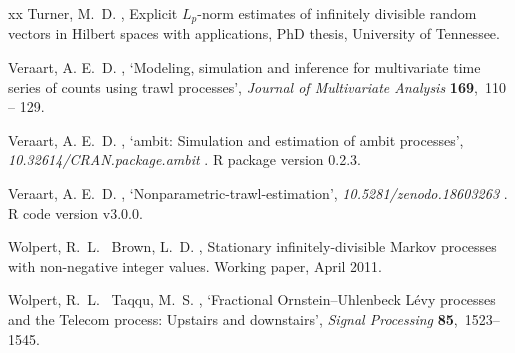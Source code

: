\documentclass{article}
\theoremstyle{plain}
\theoremstyle{definition}
\theoremstyle{remark}
\begin{document}
\begin{thebibliography}{xx}
Turner, M.~D.  \harvardyearright , Explicit $L_p $-norm estimates of infinitely divisible random vectors in {H}ilbert spaces with applications, PhD thesis, University of Tennessee.
\newline{}

Veraart, A. E.~D.  \harvardyearright , `Modeling, simulation and inference for multivariate time series of counts using trawl processes', {\em Journal of Multivariate Analysis} {\bf 169},~110 -- 129.
\newline{}

Veraart, A. E.~D.  \harvardyearright , `ambit: Simulation and estimation of ambit processes', {\em 10.32614/CRAN.package.ambit} .
\newblock R package version 0.2.3.
\newline{}

Veraart, A. E.~D.  \harvardyearright , `Nonparametric-trawl-estimation', {\em 10.5281/zenodo.18603263} .
\newblock R code version v3.0.0.
\newline{}

Wolpert, R.~L. \harvardand\ Brown, L.~D.  \harvardyearright , Stationary infinitely-divisible {M}arkov processes with non-negative integer values.
\newblock Working paper, April 2011.
\newline{}

Wolpert, R.~L. \harvardand\ Taqqu, M.~S.  \harvardyearright , `Fractional {O}rnstein--{U}hlenbeck {L}\'{e}vy processes and the {T}elecom process: {U}pstairs and downstairs', {\em Signal Processing} {\bf 85},~1523--1545.
\newline{}

\end{thebibliography}
\end{document}
